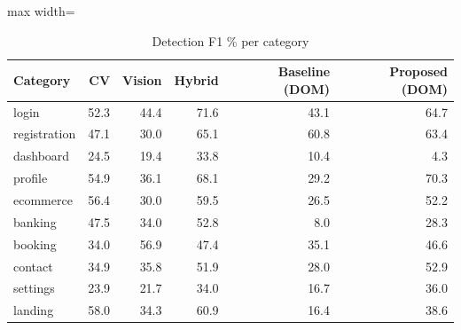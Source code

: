 \begin{table}[t]
\centering
\scriptsize
\caption{Detection F1 \% per category}
\label{tab:detcat}
\setlength{\tabcolsep}{3.5pt}
\begin{adjustbox}{max width=\columnwidth}
\begin{tabular}{lrrrrr}
\toprule
\textbf{Category} & \textbf{CV} & \textbf{Vision} & \textbf{Hybrid} & \textbf{Baseline (DOM)} & \textbf{Proposed (DOM)} \\
\midrule
login & 52.3 & 44.4 & 71.6 & 43.1 & 64.7 \\
registration & 47.1 & 30.0 & 65.1 & 60.8 & 63.4 \\
dashboard & 24.5 & 19.4 & 33.8 & 10.4 & 4.3 \\
profile & 54.9 & 36.1 & 68.1 & 29.2 & 70.3 \\
ecommerce & 56.4 & 30.0 & 59.5 & 26.5 & 52.2 \\
banking & 47.5 & 34.0 & 52.8 & 8.0 & 28.3 \\
booking & 34.0 & 56.9 & 47.4 & 35.1 & 46.6 \\
contact & 34.9 & 35.8 & 51.9 & 28.0 & 52.9 \\
settings & 23.9 & 21.7 & 34.0 & 16.7 & 36.0 \\
landing & 58.0 & 34.3 & 60.9 & 16.4 & 38.6 \\
\bottomrule
\end{tabular}
\end{adjustbox}
\end{table}
